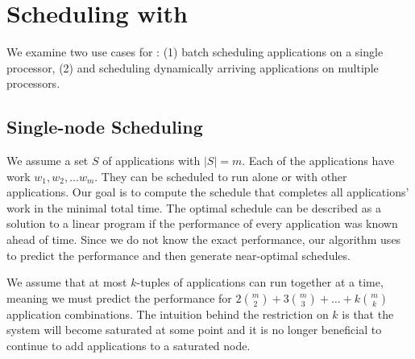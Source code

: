 \section{Scheduling with \SYSTEMESP{}}
\label{section:scheduling}
We examine two use cases for \SYSTEMESP{}: (1) batch scheduling
applications on a single processor, (2) and scheduling dynamically
arriving applications on multiple processors.

\subsection{Single-node Scheduling}
\label{sec:single_proc}
We assume a set $S$ of applications with $|S| = m$. Each of the
applications have work $w_1, w_2,. . .  w_m$. They can be scheduled to
run alone or with other applications.  Our goal is to compute the
schedule that completes all applications' work in the minimal total
time.  The optimal schedule can be described as a solution to a linear
program if the performance of every application was known ahead of
time. Since we do not know the exact performance, our algorithm uses
\SYSTEMESP{} to predict the performance and then generate near-optimal
schedules.

We assume that at most $k$-tuples of applications can run together at
a time, meaning we must predict the performance for $2\binom{m}{2} +
3\binom{m}{3} + \ldots + k\binom{m}{k}$ application combinations.  The
intuition behind the restriction on $k$ is that the system will become
saturated at some point and it is no longer beneficial to continue to
add applications to a saturated node.

